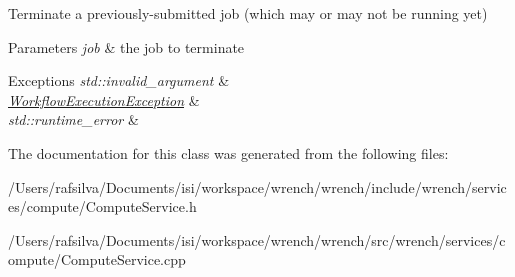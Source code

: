 Terminate a previously-\/submitted job (which may or may not be running yet) 


\begin{DoxyParams}{Parameters}
{\em job} & the job to terminate\\
\hline
\end{DoxyParams}

\begin{DoxyExceptions}{Exceptions}
{\em std\+::invalid\+\_\+argument} & \\
\hline
{\em \hyperlink{classwrench_1_1_workflow_execution_exception}{Workflow\+Execution\+Exception}} & \\
\hline
{\em std\+::runtime\+\_\+error} & \\
\hline
\end{DoxyExceptions}


The documentation for this class was generated from the following files\+:\begin{DoxyCompactItemize}
\item 
/\+Users/rafsilva/\+Documents/isi/workspace/wrench/wrench/include/wrench/services/compute/Compute\+Service.\+h\item 
/\+Users/rafsilva/\+Documents/isi/workspace/wrench/wrench/src/wrench/services/compute/Compute\+Service.\+cpp\end{DoxyCompactItemize}
